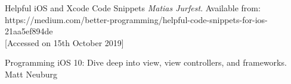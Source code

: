 \documentclass[]{article}
\newcommand{\<}{\guilsinglleft}
\renewcommand{\>}{\guilsinglright}
\renewcommand{\it}[1]{\textit{#1}}
\begin{document}
\begin{thebibliography}{99}
	
	Helpful iOS and Xcode Code Snippets
	\it{Matias Jurfest}.
	Available from:
	\<https://medium.com/better-programming/helpful-code-snippets-for-ios-21aa5ef894de\>
	\\{[Accessed on 15th October 2019]}
	
	Programming iOS 10: Dive deep into view, view controllers, and frameworks.
	Matt Neuburg

\end{thebibliography}
\end{document}
